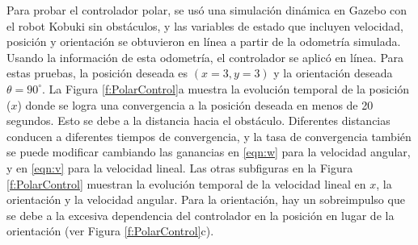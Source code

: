 Para probar el controlador polar, se usó una simulación dinámica en Gazebo con el robot 
Kobuki sin obstáculos, y las variables de estado que incluyen velocidad, posición y 
orientación se obtuvieron en línea a partir de la odometría simulada. Usando la información 
de esta odometría, el controlador se aplicó en línea. Para estas pruebas, la posición deseada
es $(x = 3, y = 3)$ y la orientación deseada $\theta = 90^{\circ}$. La Figura 
\ref{f:PolarControl}a muestra la evolución temporal de la posición ($x$) donde 
se logra una convergencia a la posición deseada en menos de 20 segundos. Esto se debe a 
la distancia hacia el obstáculo. Diferentes distancias conducen a diferentes tiempos de 
convergencia, y la tasa de convergencia también se puede modificar cambiando las 
ganancias en \ref{eqn:w} para la velocidad angular, y en \ref{eqn:v} para la velocidad 
lineal. Las otras subfiguras en la Figura \ref{f:PolarControl} muestran la evolución 
temporal de la velocidad lineal en $x$, la orientación y la velocidad angular. Para la 
orientación, hay un sobreimpulso que se debe a la excesiva dependencia del controlador 
en la posición en lugar de la orientación (ver Figura \ref{f:PolarControl}c).
